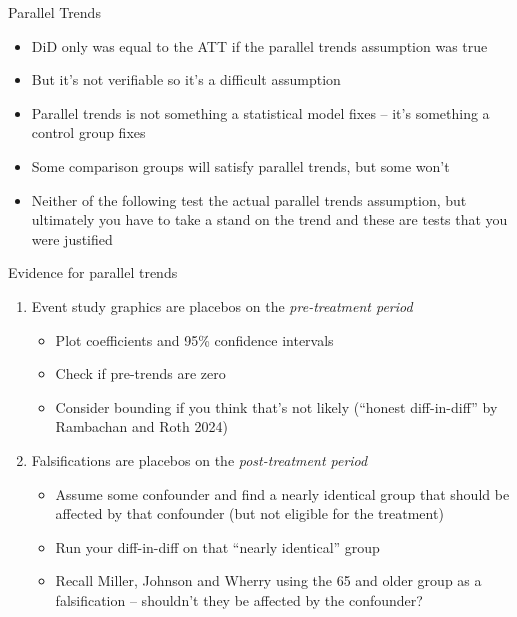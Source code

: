 \documentclass{beamer}
\begin{document}
\begin{frame}{Parallel Trends}

\begin{itemize}

\item DiD only was equal to the ATT if the parallel trends assumption was true
\item But it's not verifiable so it's a difficult assumption
\item Parallel trends is not something a statistical model fixes -- it's something a control group fixes
\item Some comparison groups will satisfy parallel trends, but some won't
\item Neither of the following test the actual parallel trends assumption, but ultimately you have to take a stand on the trend and these are tests that you were justified


\end{itemize}

\end{frame}

\begin{frame}{Evidence for parallel trends}



\begin{enumerate}

\item Event study graphics are placebos on the \emph{pre-treatment period}
	\begin{itemize}
	\item Plot coefficients and 95\% confidence intervals 
	\item Check if pre-trends are zero 
	\item Consider bounding if you think that's not likely (``honest diff-in-diff'' by Rambachan and Roth 2024)
	\end{itemize}
\item Falsifications are placebos on the \emph{post-treatment period}
	\begin{itemize}
	\item Assume some confounder and find a nearly identical group that should be affected by that confounder (but not eligible for the treatment)
	\item Run your diff-in-diff on that ``nearly identical'' group 
	\item Recall Miller, Johnson and Wherry using the 65 and older group as a falsification -- shouldn't they be affected by the confounder?
	\end{itemize}



\end{enumerate}

\end{frame}
\end{document}
